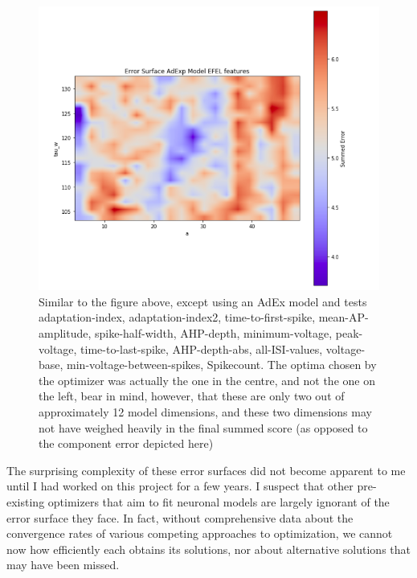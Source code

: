 \begin{figure}
    \centering
    \includegraphics[scale=1.25]{figures/adexp_efel_problem.png}
    \caption[A very complicated but not hopeless error surfaces]{Similar to the figure above, except using an AdEx model and tests adaptation-index, adaptation-index2, time-to-first-spike, mean-AP-amplitude, spike-half-width,  AHP-depth, minimum-voltage, peak-voltage, time-to-last-spike, AHP-depth-abs, all-ISI-values, voltage-base, min-voltage-between-spikes, Spikecount.
    The optima chosen by the optimizer was actually the one in the centre, and not the one on the left, bear in mind, however, that these are only two out of approximately 12 model dimensions, and these two dimensions may not have weighed heavily in the final summed score (as opposed to the component error depicted here)}
    \label{fig:real_problem_nontrivial_surface-1}
\end{figure}


The surprising complexity of these error surfaces did not become apparent to me until I had worked on this project for a few years.
I suspect that other pre-existing optimizers that aim to fit neuronal models are largely ignorant of the error surface they face.
In fact, without comprehensive data about the convergence rates of various competing approaches to optimization, we cannot now how efficiently each obtains its solutions, nor about alternative solutions that may have been missed.

